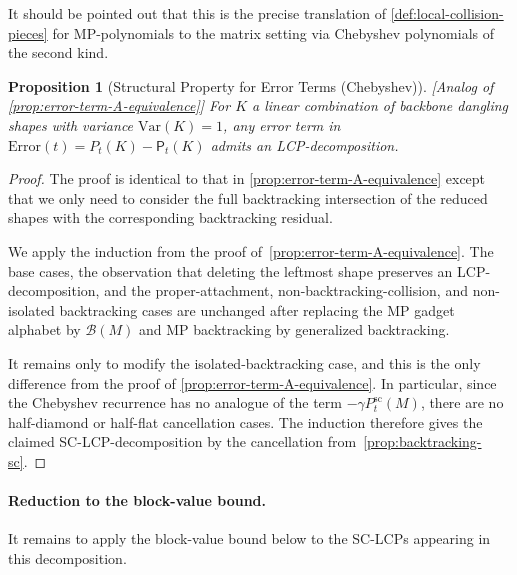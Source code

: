 \documentclass[12pt]{article}
\newcommand{\Var}{\mathrm{Var}}
\newtheorem{proposition}[theorem]{Proposition}
\newcommand{\calB}{\mathcal{B}}
\newcommand{\fp}{\mathsf{P}}
\newcommand{\todo}[1]{\textcolor{red}{(#1)}}
\begin{document}
	It should be pointed out that this is the precise translation of \cref{def:local-collision-pieces} for MP-polynomials to the matrix setting via Chebyshev polynomials of the second kind.
	
	
\begin{proposition}[Structural Property for Error Terms (Chebyshev)]
\label{prop:chebyshev-error-term} 
[Analog of \cref{prop:error-term-A-equivalence}]
For $K$ a linear combination of backbone dangling shapes with variance $\Var(K)=1$, any error term in $\text{Error}(t) = P_t(K)- \fp_t(K) $
admits an LCP-decomposition.
%
\end{proposition}

\begin{proof}
	The proof is identical to that in \cref{prop:error-term-A-equivalence} except that we only need to consider the full backtracking intersection of the reduced shapes with the corresponding backtracking residual.
	
	We apply the induction from the proof of~\cref{prop:error-term-A-equivalence}. The base cases, the observation
that deleting the leftmost shape preserves an LCP-decomposition, and
the proper-attachment, non-backtracking-collision, and non-isolated
backtracking cases are unchanged after replacing the MP gadget alphabet
by \(\calB(M)\) and MP backtracking by generalized backtracking.

It remains only to modify the isolated-backtracking case, and this is the only difference from the proof of
\cref{prop:error-term-A-equivalence}. In particular, since the
Chebyshev recurrence has no analogue of the term
\(-\gamma P^{\mathrm{sc}}_t(M)\), there are no half-diamond or half-flat
cancellation cases. The induction therefore gives the claimed
SC-LCP-decomposition by the cancellation from~\cref{prop:backtracking-sc}. 
\end{proof}

\paragraph{Reduction to the block-value bound.}
It remains to apply the block-value bound below to the
SC-LCPs appearing in this decomposition.
\end{document}
